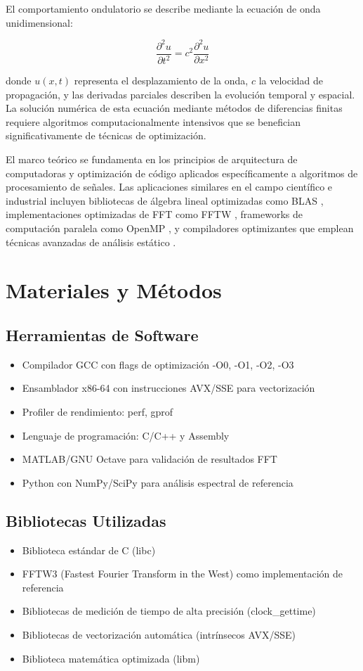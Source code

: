 \documentclass[a4paper]{article}
\begin{document}
El comportamiento ondulatorio se describe mediante la ecuación de onda unidimensional:

\begin{equation}
\frac{\partial^2 u}{\partial t^2} = c^2 \frac{\partial^2 u}{\partial x^2}
\end{equation}

donde $u(x,t)$ representa el desplazamiento de la onda, $c$ la velocidad de propagación, y las derivadas parciales describen la evolución temporal y espacial. La solución numérica de esta ecuación mediante métodos de diferencias finitas requiere algoritmos computacionalmente intensivos que se benefician significativamente de técnicas de optimización.

El marco teórico se fundamenta en los principios de arquitectura de computadoras y optimización de código aplicados específicamente a algoritmos de procesamiento de señales. Las aplicaciones similares en el campo científico e industrial incluyen bibliotecas de álgebra lineal optimizadas como BLAS \cite{lawson1979basic}, implementaciones optimizadas de FFT como FFTW \cite{frigo2005design}, frameworks de computación paralela como OpenMP \cite{dagum1998openmp}, y compiladores optimizantes que emplean técnicas avanzadas de análisis estático \cite{muchnick1997advanced}.

\section{Materiales y Métodos}

\subsection{Herramientas de Software}
\begin{itemize}
\item Compilador GCC con flags de optimización -O0, -O1, -O2, -O3
\item Ensamblador x86-64 con instrucciones AVX/SSE para vectorización
\item Profiler de rendimiento: perf, gprof
\item Lenguaje de programación: C/C++ y Assembly
\item MATLAB/GNU Octave para validación de resultados FFT
\item Python con NumPy/SciPy para análisis espectral de referencia
\end{itemize}

\subsection{Bibliotecas Utilizadas}
\begin{itemize}
\item Biblioteca estándar de C (libc)
\item FFTW3 (Fastest Fourier Transform in the West) como implementación de referencia
\item Bibliotecas de medición de tiempo de alta precisión (clock\_gettime)
\item Bibliotecas de vectorización automática (intrínsecos AVX/SSE)
\item Biblioteca matemática optimizada (libm)
\end{itemize}
\end{document}
